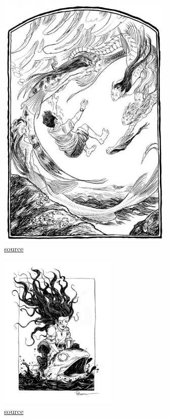 \documentclass[12pt,a4paper,twoside,openany]{book}
\begin{document}



\begin{figure}[h!]
  \centering
  \caption{\href{https://cz.pinterest.com/pin/750623462885443700/}{source}}
  \includegraphics[width=0.75\textwidth]{ryba}
\end{figure}




\begin{figure}[h!]
  \centering
  \caption{\href{https://www.pinterest.com/pin/484418503638647556/}{source}}
  \includegraphics[width=0.5\textwidth]{zaba}
\end{figure}
\end{document}
